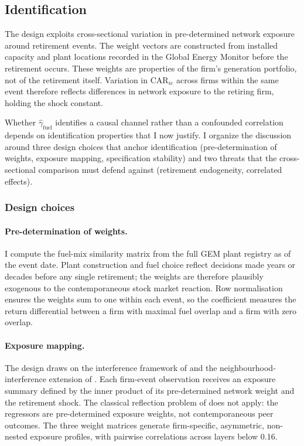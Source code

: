 \documentclass[12pt,a4paper]{article}
\begin{document}
\subsection{Identification}\label{sec:identification}

The design exploits cross-sectional variation in pre-determined network exposure around retirement events. The weight vectors are constructed from installed capacity and plant locations recorded in the Global Energy Monitor before the retirement occurs. These weights are properties of the firm's generation portfolio, not of the retirement itself. Variation in $\text{CAR}_{ie}$ across firms within the same event therefore reflects differences in network exposure to the retiring firm, holding the shock constant.

Whether $\hat\gamma_{\text{fuel}}$ identifies a causal channel rather than a confounded correlation depends on identification properties that I now justify. I organize the discussion around three design choices that anchor identification (pre-determination of weights, exposure mapping, specification stability) and two threats that the cross-sectional comparison must defend against (retirement endogeneity, correlated effects).

\subsubsection*{Design choices}

\paragraph{Pre-determination of weights.}
I compute the fuel-mix similarity matrix from the full GEM plant registry as of the event date. Plant construction and fuel choice reflect decisions made years or decades before any single retirement; the weights are therefore plausibly exogenous to the contemporaneous stock market reaction. Row normalisation ensures the weights sum to one within each event, so the coefficient measures the return differential between a firm with maximal fuel overlap and a firm with zero overlap.

\paragraph{Exposure mapping.}
The design draws on the interference framework of \citet{AronowSamii2017} and the neighbourhood-interference extension of \citet{Leung2022}. Each firm-event observation receives an exposure summary defined by the inner product of its pre-determined network weight and the retirement shock. The classical reflection problem of \citet{Manski1993} does not apply: the regressors are pre-determined exposure weights, not contemporaneous peer outcomes. The three weight matrices generate firm-specific, asymmetric, non-nested exposure profiles, with pairwise correlations across layers below 0.16.
\end{document}
